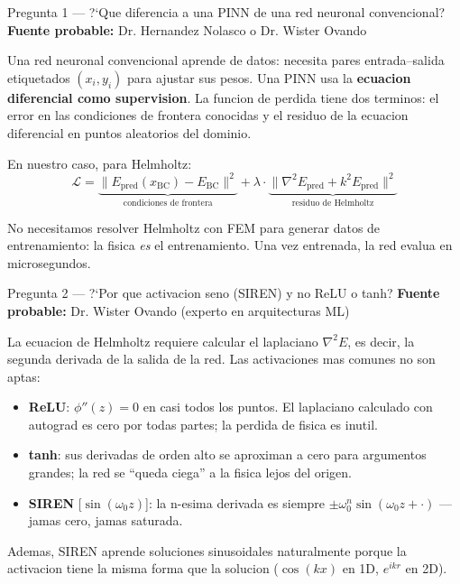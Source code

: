 \vspace{12pt}

\begin{qabox}{Pregunta 1 --- ?`Que diferencia a una PINN de una red neuronal convencional?}
\textbf{Fuente probable:} Dr. Hernandez Nolasco o Dr. Wister Ovando
\end{qabox}

\begin{answerbox}
Una red neuronal convencional aprende de datos: necesita pares entrada--salida
etiquetados $(x_i, y_i)$ para ajustar sus pesos. Una PINN usa la \textbf{ecuacion
diferencial como supervision}. La funcion de perdida tiene dos terminos: el error
en las condiciones de frontera conocidas y el residuo de la ecuacion diferencial
en puntos aleatorios del dominio.

En nuestro caso, para Helmholtz:
\[
  \mathcal{L} = \underbrace{\|E_\text{pred}(x_\text{BC}) - E_\text{BC}\|^2}_{\text{condiciones de frontera}} +
  \lambda \cdot \underbrace{\|\nabla^2 E_\text{pred} + k^2 E_\text{pred}\|^2}_{\text{residuo de Helmholtz}}
\]

No necesitamos resolver Helmholtz con FEM para generar datos de entrenamiento: la
fisica \emph{es} el entrenamiento. Una vez entrenada, la red evalua en microsegundos.
\end{answerbox}

\vspace{8pt}

\begin{qabox}{Pregunta 2 --- ?`Por que activacion seno (SIREN) y no ReLU o tanh?}
\textbf{Fuente probable:} Dr. Wister Ovando (experto en arquitecturas ML)
\end{qabox}

\begin{answerbox}
La ecuacion de Helmholtz requiere calcular el laplaciano $\nabla^2 E$, es decir,
la segunda derivada de la salida de la red. Las activaciones mas comunes no son
aptas:

\begin{itemize}
  \item \textbf{ReLU}: $\phi''(z) = 0$ en casi todos los puntos. El laplaciano
        calculado con autograd es cero por todas partes; la perdida de fisica es inutil.
  \item \textbf{tanh}: sus derivadas de orden alto se aproximan a cero para argumentos
        grandes; la red se ``queda ciega'' a la fisica lejos del origen.
  \item \textbf{SIREN} [$\sin(\omega_0 z)$]: la n-esima derivada es siempre
        $\pm\omega_0^n \sin(\omega_0 z + \cdot)$ --- jamas cero, jamas saturada.
\end{itemize}

Ademas, SIREN aprende soluciones sinusoidales naturalmente porque la activacion
tiene la misma forma que la solucion ($\cos(kx)$ en 1D, $e^{ikr}$ en 2D).
\end{answerbox}

